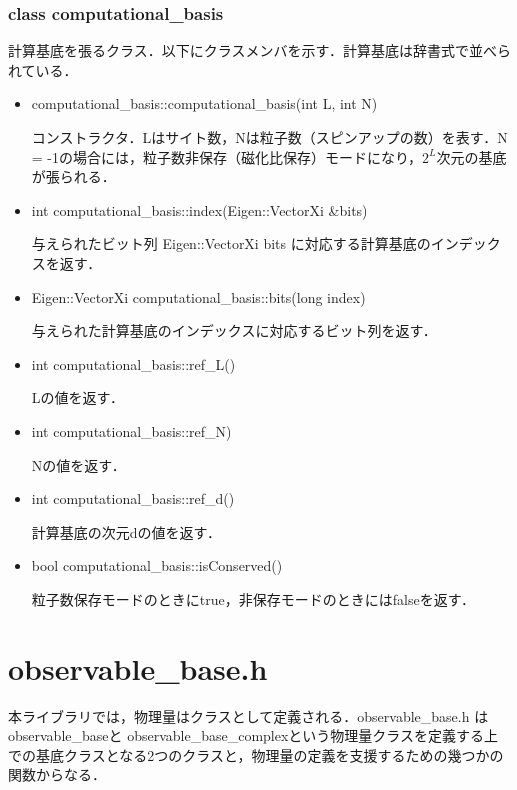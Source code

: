 \documentclass[report, 11pt, uplatex]{jsbook}
\begin{document}
	\subsubsection*{class computational\_basis}
	計算基底を張るクラス．以下にクラスメンバを示す．計算基底は辞書式で並べられている．
	
	\begin{itemize}
		\item computational\_basis::computational\_basis(int L, int N)
		
		コンストラクタ．Lはサイト数，Nは粒子数（スピンアップの数）を表す．N = -1の場合には，粒子数非保存（磁化比保存）モードになり，$2^L$次元の基底が張られる．
		
		\item int computational\_basis::index(Eigen::VectorXi \&bits)
		
		与えられたビット列 Eigen::VectorXi bits に対応する計算基底のインデックスを返す．
		
		\item Eigen::VectorXi computational\_basis::bits(long index)
		
		与えられた計算基底のインデックスに対応するビット列を返す．
		
		\item int computational\_basis::ref\_L()
		
		Lの値を返す．
		
		\item int computational\_basis::ref\_N)
		
		Nの値を返す．
		
		\item int computational\_basis::ref\_d()
		
		計算基底の次元dの値を返す．
		
		\item bool computational\_basis::isConserved()
		
		粒子数保存モードのときにtrue，非保存モードのときにはfalseを返す．
		
	\end{itemize}
	
	\section{observable\_base.h}
	本ライブラリでは，物理量はクラスとして定義される．observable\_base.h はobservable\_baseと observable\_base\_complexという物理量クラスを定義する上での基底クラスとなる2つのクラスと，物理量の定義を支援するための幾つかの関数からなる．
	
\end{document}
